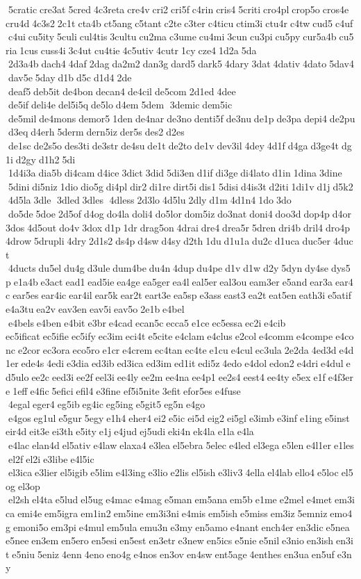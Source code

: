  5cratic cre3at 5cred 4c3reta cre4v cri2 cri5f c4rin cris4 5criti cro4pl crop5o cros4e cru4d 4c3s2 2c1t cta4b ct5ang c5tant c2te c3ter c4ticu ctim3i ctu4r c4tw cud5 c4uf c4ui cu5ity 5culi cul4tis 3cultu cu2ma c3ume cu4mi 3cun cu3pi cu5py cur5a4b cu5ria 1cus cuss4i 3c4ut cu4tie 4c5utiv 4cutr 1cy cze4 1d2a 5da  2d3a4b dach4 4daf 2dag da2m2 dan3g dard5 dark5 4dary 3dat 4dativ 4dato 5dav4 dav5e 5day d1b d5c d1d4 2de  deaf5 deb5it de4bon decan4 de4cil de5com 2d1ed 4dee  de5if deli4e del5i5q de5lo d4em 5dem  3demic dem5ic  de5mil de4mons demor5 1den de4nar de3no denti5f de3nu de1p de3pa depi4 de2pu d3eq d4erh 5derm dern5iz der5s des2 d2es  de1sc de2s5o des3ti de3str de4su de1t de2to de1v dev3il 4dey 4d1f d4ga d3ge4t dg1i d2gy d1h2 5di  1d4i3a dia5b di4cam d4ice 3dict 3did 5di3en d1if di3ge di4lato d1in 1dina 3dine  5dini di5niz 1dio dio5g di4pl dir2 di1re dirt5i dis1 5disi d4is3t d2iti 1di1v d1j d5k2 4d5la 3dle  3dled 3dles  4dless 2d3lo 4d5lu 2dly d1m 4d1n4 1do 3do  do5de 5doe 2d5of d4og do4la doli4 do5lor dom5iz do3nat doni4 doo3d dop4p d4or 3dos 4d5out do4v 3dox d1p 1dr drag5on 4drai dre4 drea5r 5dren dri4b dril4 dro4p 4drow 5drupli 4dry 2d1s2 ds4p d4sw d4sy d2th 1du d1u1a du2c d1uca duc5er 4duct  4ducts du5el du4g d3ule dum4be du4n 4dup du4pe d1v d1w d2y 5dyn dy4se dys5p e1a4b e3act ead1 ead5ie ea4ge ea5ger ea4l eal5er eal3ou eam3er e5and ear3a ear4c ear5es ear4ic ear4il ear5k ear2t eart3e ea5sp e3ass east3 ea2t eat5en eath3i e5atif e4a3tu ea2v eav3en eav5i eav5o 2e1b e4bel  e4bels e4ben e4bit e3br e4cad ecan5c ecca5 e1ce ec5essa ec2i e4cib 	ec5ificat ec5ifie ec5ify ec3im eci4t e5cite e4clam e4clus e2col e4comm e4compe e4conc e2cor ec3ora eco5ro e1cr e4crem ec4tan ec4te e1cu e4cul ec3ula 2e2da 4ed3d e4d1er ede4s 4edi e3dia ed3ib ed3ica ed3im ed1it edi5z 4edo e4dol edon2 e4dri e4dul ed5ulo ee2c eed3i ee2f eel3i ee4ly ee2m ee4na ee4p1 ee2s4 eest4 ee4ty e5ex e1f e4f3ere 1eff e4fic 5efici efil4 e3fine 	ef5i5nite 3efit efor5es e4fuse  4egal eger4 eg5ib eg4ic eg5ing e5git5 eg5n e4go  e4gos eg1ul e5gur 5egy e1h4 eher4 ei2 e5ic ei5d eig2 ei5gl e3imb e3inf e1ing e5inst eir4d eit3e ei3th e5ity e1j e4jud ej5udi eki4n ek4la e1la e4la  e4lac elan4d el5ativ e4law elaxa4 e3lea el5ebra 5elec e4led el3ega e5len e4l1er e1les el2f el2i e3libe e4l5ic  el3ica e3lier el5igib e5lim e4l3ing e3lio e2lis el5ish e3liv3 4ella el4lab ello4 e5loc el5og el3op  el2sh el4ta e5lud el5ug e4mac e4mag e5man em5ana em5b e1me e2mel e4met em3ica emi4e em5igra em1in2 em5ine em3i3ni e4mis em5ish e5miss em3iz 5emniz emo4g emoni5o em3pi e4mul em5ula emu3n e3my en5amo e4nant ench4er en3dic e5nea e5nee en3em en5ero en5esi en5est en3etr e3new en5ics e5nie e5nil e3nio en3ish en3it e5niu 5eniz 4enn 4eno eno4g e4nos en3ov en4sw ent5age 4enthes en3ua en5uf e3ny 